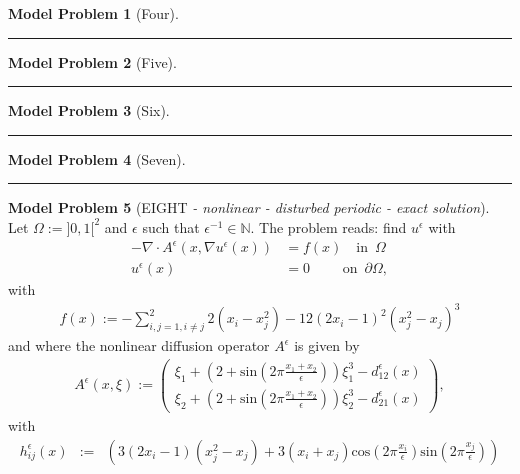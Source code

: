 \documentclass[a4paper,11pt]{article}
\theoremstyle{definition}
\newtheorem{modelproblem}{Model Problem} %
\begin{document}
\begin{modelproblem}[Four]

\end{modelproblem}
\hrule

\begin{modelproblem}[Five]

\end{modelproblem}
\hrule

\begin{modelproblem}[Six]

\end{modelproblem}
\hrule


\begin{modelproblem}[Seven]

\end{modelproblem}
\hrule

\begin{modelproblem}[EIGHT {\it- nonlinear - disturbed periodic - exact solution}]
Let $\Omega := ]0,1[^2$ and $\epsilon$ such that $\epsilon^{-1} \in \mathbb{N}$.  The problem reads: find $u^{\epsilon}$ with
\begin{align*}
- \nabla \cdot A^{\epsilon}(x,\nabla u^{\epsilon}(x)) &= f(x) \quad \mbox{in} \enspace \Omega \\
u^{\epsilon}(x) &= 0 \hspace{28pt} \mbox{on} \enspace \partial \Omega,
\end{align*}
with
\begin{eqnarray*}
 f(x) := - \sum_{i,j=1,i\neq j}^2  2(x_i - x_j^2 ) - 12 (2 x_i - 1)^2(x_j^2 - x_j)^3
\end{eqnarray*}
and where the nonlinear diffusion operator  $A^{\epsilon}$ is given by
\begin{eqnarray*}
A^{\epsilon}(x,\xi) := \left( \begin{array}{c}
                                 \xi_1 + (2 + \mbox{sin}(2 \pi \frac{x_1 + x_2}{\epsilon} )) \xi_1^3 - d^{\epsilon}_{12}(x) \\
                                 \xi_2 + (2 + \mbox{sin}(2 \pi \frac{x_1 + x_2}{\epsilon} )) \xi_2^3 - d^{\epsilon}_{21}(x)
                               \end{array}\right),
\end{eqnarray*}
with
\begin{eqnarray*}
h_{ij}^{\epsilon}(x) &:=& \left( 3 ( 2 x_i - 1) (x_j^2 - x_j )
                   + 3 ( x_i + x_j ) \mbox{cos}( 2 \pi \frac{x_i}{\epsilon} ) \mbox{sin}( 2 \pi \frac{x_j}{\epsilon} ) \right)\\

\end{eqnarray*}
\end{modelproblem}
\end{document}

